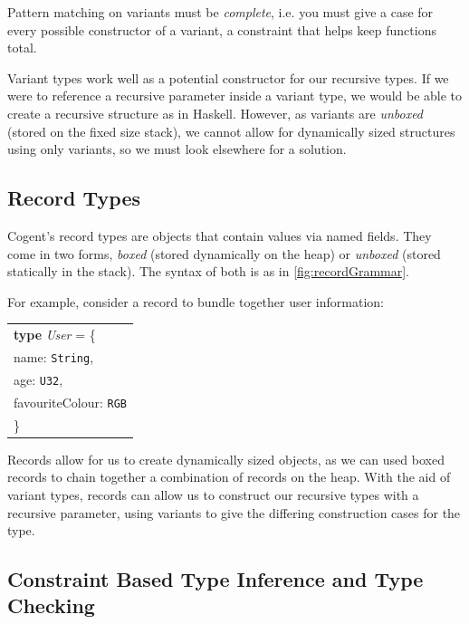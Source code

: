 Pattern matching on variants must be \textit{complete}, i.e. you must give a case for every possible constructor
of a variant, a constraint that helps keep functions total.

Variant types work well as a potential constructor for our recursive types. If we were to reference a
recursive parameter inside a variant type, we would be able to create a recursive structure as in Haskell.
However, as variants are \textit{unboxed} (stored on the fixed size stack), we cannot allow for dynamically sized structures
using only variants, so we must look elsewhere for a solution.

\subsection{Record Types}

Cogent's record types are objects that contain values via named fields. They come in two forms, \textit{boxed}
(stored dynamically on the heap) or \textit{unboxed} (stored statically in the stack). The syntax of both is
as in \autoref{fig:recordGrammar}.

For example, consider a record to bundle together user information:

\begin{center}
    \begin{tabular}{l}
    \textbf{type} \textit{User} = \{ \\
                    \hspace{1.5em} name: \texttt{String},\\
                    \hspace{1.5em} age: \texttt{U32}, \\
                    \hspace{1.5em} favouriteColour: \texttt{RGB}\\
                    \} \\
    \end{tabular}
\end{center}

Records allow for us to create dynamically sized objects, as we can used boxed records to chain together a
combination of records on the heap. With the aid of variant types, records can allow us to construct 
our recursive types with a recursive parameter, using variants to give the 
differing construction cases for the type.

\subsection{Constraint Based Type Inference and Type Checking}

